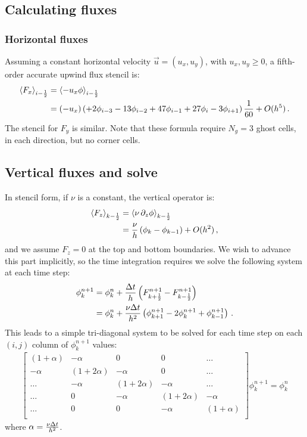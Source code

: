 \documentclass[11pt]{article}
\begin{document}
\subsection{Calculating fluxes}

\subsubsection{Horizontal fluxes}
Assuming a constant horizontal velocity $\vec{u} = (u_x, u_y)$,
  with $u_x, u_y \ge 0$,
  a fifth-order accurate upwind flux stencil is:
\begin{align}
  \nonumber
  \left\langle F_x \right\rangle_{i - {\frac{1}{2}}} & = \left\langle -u_x \phi \right\rangle_{i - {\frac{1}{2}}} \\
\label{eqn:oh5upwind}
  & = (-u_x) 
  \left( 
    +2 \phi_{i - 3}
    -13 \phi_{i - 2}
    +47 \phi_{i - 1}
    +27 \phi_{i}
    -3 \phi_{i + 1}
  \right)
  \frac{1}{60}
  + O(h^5) \, .
\end{align}
The stencil for $F_y$ is similar. Note that these formula require
  $N_g = 3$ ghost cells, in each direction, but no corner cells.

\subsection{Vertical fluxes and solve}
In stencil form, if $\nu$ is a constant, the vertical operator is:
\begin{align}
  \left\langle F_z \right\rangle_{k - {\frac{1}{2}}} & = \left\langle \nu \, \partial_z \phi \right\rangle_{k - {\frac{1}{2}}} \\ 
   & = \frac{\nu}{h} \left( \phi_{k} - \phi_{k-1} \right) + O(h^2) \, ,
\end{align}
  and we assume $F_z = 0$ at the top and bottom boundaries.
We wish to advance this part implicitly, so the time integration 
  requires we solve the following system at each time step:
\begin{align}
 \phi^{n+1}_k & = 
    \phi^n_k + \frac{{\Delta t}}{h} 
    \left(F^{n+1}_{k+{\frac{1}{2}}} - F^{n+1}_{k-{\frac{1}{2}}} \right) 
\\
 & = \phi^n_k +
    \frac{\nu {\Delta t}}{h^2} 
    \left(\phi^{n+1}_{k+1}-2\phi^{n+1}_{k}+\phi^{n+1}_{k-1}\right) \, .
\end{align}
This leads to a simple tri-diagonal system to be solved
  for each time step on each $(i,j)$ column of $\phi^{n+1}_k$ values:
\begin{align}
\label{eqn:vertsolve}
  \begin{bmatrix}
    (1 + \alpha) & -\alpha & 0 & 0 & \dots  \\
    -\alpha & (1 + 2 \alpha) & -\alpha & 0 & \dots  \\
    \dots & -\alpha & (1 + 2 \alpha) & -\alpha & \dots  \\
    \dots & 0 & -\alpha & (1 + 2 \alpha) & -\alpha \\
    \dots & 0 &  0 & -\alpha & (1 + \alpha) \\
  \end{bmatrix}
  \phi^{n+1}_k = \phi^n_k
\end{align}
  where $\alpha = \frac{\nu {\Delta t}}{h^2}$.
\end{document}
